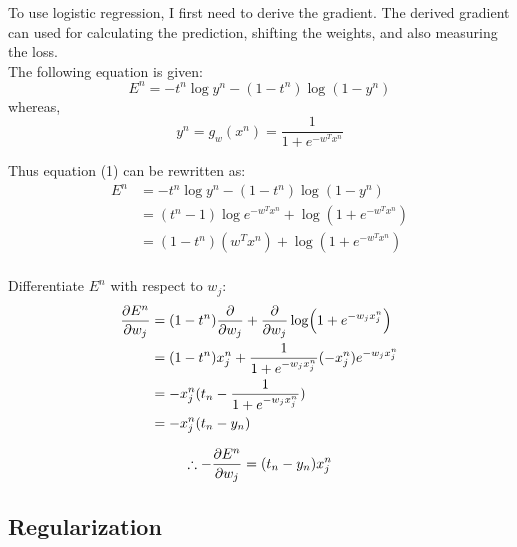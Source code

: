 \documentclass[11pt,twoside]{article}
\begin{document}
To use logistic regression, I first need to derive the gradient. The derived gradient can used for calculating the prediction, shifting the weights, and also measuring the loss.\\

The following equation is given:\\
\begin{equation}
E^{n} = -t^{n}\log y^{n} - (1 - t^{n})\log (1 - y^n)
\end{equation}
whereas,
\begin{equation}
y^{n} = g_{w}(x^{n}) = \frac{1}{1 + e^{-w^{T}x^{n}}}
\end{equation}

Thus equation (1) can be rewritten as:\\
\begin{equation}
\begin{split}
E^{n} & = -t^{n}\log y^{n} - (1 - t^{n})\log (1 - y^n)\\
& = (t^{n} - 1)\log e^{-w^{T}x^{n}} + \log (1 + e^{-w^{T}x^{n}})\\
& = (1 - t^{n})(w^{T}x^{n}) + \log (1 + e^{-w^{T} x^{n}})\\
\end{split}
\end{equation}

Differentiate $E^{n}$ with respect to $w_{j}$:\\
\begin{equation}
\begin{split}
\pdv{E^{n}}{w_{j}} & = (1 - t^{n})\pdv{}{w_{j}} (w_{j} x^{n}_{j}) + \pdv{}{w_{j}}\log (1 + e^{-w_{j} x^{n}_{j}})\\
& = (1 - t^{n})x^{n}_{j} + \frac{1}{1 + e^{-w_{j} x^{n}_{j}}} (-x^{n}_{j})e^{-w_{j} x^{n}_{j}}\\
& = -x^{n}_{j}(t_{n} - \frac{1}{1 + e^{-w_{j} x^{n}_{j}}})\\
& = -x^{n}_{j}(t_{n} - y_{n})\\
\end{split}
\end{equation}

\begin{equation}
\therefore -\pdv{E^{n}}{w_{j}} = (t_{n} - y_{n})x^{n}_{j}
\end{equation} 

\subsection{Regularization}
\end{document}
